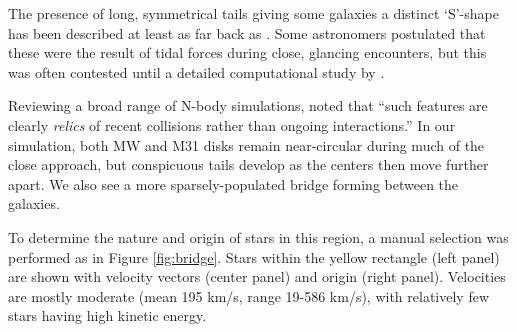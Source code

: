 \documentclass[twocolumn]{aastex63}
\begin{document}

The presence of long, symmetrical tails giving some galaxies a distinct `S'-shape has been described at least as far back as \citet{zwicky_novel_1955}. Some astronomers postulated that these were the result of tidal forces during close, glancing encounters, but this was often contested until a detailed computational study by \citet{toomre_galactic_1972}.

Reviewing a broad range of N-body simulations, \citet{barnes_dynamics_1992} noted that ``such features are clearly \textit{relics} of recent collisions rather than ongoing interactions.'' In our simulation, both MW and M31 disks remain near-circular during much of the close approach, but conspicuous tails develop as the centers then move further apart. We also see a more sparsely-populated bridge forming between the galaxies.

To determine the nature and origin of stars in this region, a manual selection was performed as in Figure \ref{fig:bridge}. Stars within the yellow rectangle (left panel) are shown with velocity vectors (center panel) and origin (right panel). Velocities are mostly moderate (mean 195 km/s, range 19-586 km/s), with relatively few stars having high kinetic energy. 
\end{document}
